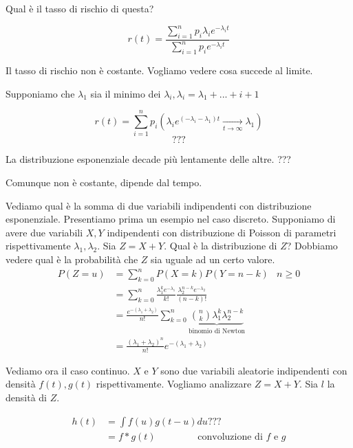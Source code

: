 \documentclass[a4paper,12pt]{book}
\begin{document}

Qual è il tasso di rischio di questa? %

$$ r(t) = \frac{\sum_{i = 1}^{n} p_i \lambda_i e^{-\lambda_i t}}{\sum_{i = 1}^{n} p_i e^{-\lambda_i t}} $$

Il tasso di rischio non è costante. Vogliamo vedere cosa succede al limite. 

Supponiamo che $\lambda_1$ sia il minimo dei $\lambda_i, \lambda_i = \lambda_1 + ... + i + 1$ %

$$ r(t) = \sum_{i = 1}^{n} p_i(\lambda_i e ^{(-\lambda_i - \lambda_1) t } \underset{t \to \infty}{\longrightarrow} \lambda_1) $$
$$ ??? $$ %

La distribuzione esponenziale decade più lentamente delle altre. ??? %

Comunque non è costante, dipende dal tempo. 

Vediamo qual è la somma di due variabili indipendenti con distribuzione esponenziale. Presentiamo prima un esempio nel caso discreto. Supponiamo di avere due variabili $ X, Y $ indipendenti con distribuzione di Poisson di parametri rispettivamente $\lambda_1, \lambda_2$. Sia $ Z = X + Y $. Qual è la distribuzione di $ Z $? Dobbiamo vedere qual è la probabilità che $ Z $ sia uguale ad un certo valore. 
\begin{align*}
	P(Z = u) & = \sum_{k = 0}^{n} P(X = k)P(Y = n-k) & n \ge 0 \\
	& = \sum_{k=0}^{n} \frac{\lambda_1^k e^{-\lambda_1}} {k!} \frac{\lambda_2^{n-k} e^{-\lambda_2}}{(n-k)!} \\
	& = \frac{e^{-(\lambda_1 + \lambda_2)}}{n!} \sum_{k=0}^{n} \underbrace{\binom{n}{k} \lambda_1^k \lambda_2^{n-k}}_{\text{binomio di Newton}} \\
	& = \frac{(\lambda_1 + \lambda_2)^n}{n!} e^{-(\lambda_1 + \lambda_2)}
\end{align*}

Vediamo ora il caso continuo. $ X $ e $ Y $ sono due variabili aleatorie indipendenti con densità $ f(t), g(t) $ rispettivamente. Vogliamo analizzare $ Z = X + Y$. Sia $ l $ la densità di $ Z $. 

\begin{align*}
	h(t) & = \int f(u) g(t-u) du ??? \\%
	& = f * g(t) \qquad \qquad \text{ convoluzione di } f \text{ e } g
\end{align*}
\end{document}
